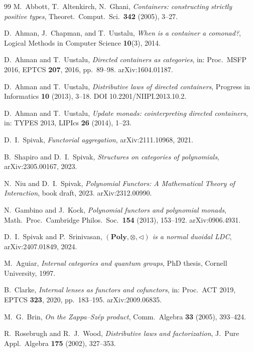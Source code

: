 \documentclass[11pt]{report}
\theoremstyle{plain}
\theoremstyle{definition}
\theoremstyle{remark}
\begin{document}
\begin{thebibliography}{99}
 M.~Abbott, T.~Altenkirch, N.~Ghani, \emph{Containers: constructing strictly positive types}, Theoret.\ Comput.\ Sci.\ \textbf{342} (2005), 3--27.

 D.~Ahman, J.~Chapman, and T.~Uustalu, \emph{When is a container a comonad?}, Logical Methods in Computer Science \textbf{10}(3), 2014.

 D.~Ahman and T.~Uustalu, \emph{Directed containers as categories}, in: Proc.\ MSFP 2016, EPTCS \textbf{207}, 2016, pp.\ 89--98. arXiv:1604.01187.

 D.~Ahman and T.~Uustalu, \emph{Distributive laws of directed containers}, Progress in Informatics \textbf{10} (2013), 3--18. DOI 10.2201/NIIPI.2013.10.2.

 D.~Ahman and T.~Uustalu, \emph{Update monads: cointerpreting directed containers}, in: TYPES 2013, LIPIcs \textbf{26} (2014), 1--23.

 D.~I.~Spivak, \emph{Functorial aggregation}, arXiv:2111.10968, 2021.

 B.~Shapiro and D.~I.~Spivak, \emph{Structures on categories of polynomials}, arXiv:2305.00167, 2023.

 N.~Niu and D.~I.~Spivak, \emph{Polynomial Functors: A Mathematical Theory of Interaction}, book draft, 2023. arXiv:2312.00990.

 N.~Gambino and J.~Kock, \emph{Polynomial functors and polynomial monads}, Math.\ Proc.\ Cambridge Philos.\ Soc.\ \textbf{154} (2013), 153--192. arXiv:0906.4931.

 D.~I.~Spivak and P.~Srinivasan, \emph{$(\mathbf{Poly},\otimes,\triangleleft)$ is a normal duoidal LDC}, arXiv:2407.01849, 2024.

 M.~Aguiar, \emph{Internal categories and quantum groups}, PhD thesis, Cornell University, 1997.

 B.~Clarke, \emph{Internal lenses as functors and cofunctors}, in: Proc.\ ACT 2019, EPTCS \textbf{323}, 2020, pp.\ 183--195. arXiv:2009.06835.

 M.~G.~Brin, \emph{On the Zappa--Sz\'ep product}, Comm.\ Algebra \textbf{33} (2005), 393--424.

 R.~Rosebrugh and R.~J.~Wood, \emph{Distributive laws and factorization}, J.\ Pure Appl.\ Algebra \textbf{175} (2002), 327--353.


\end{thebibliography}
\end{document}
